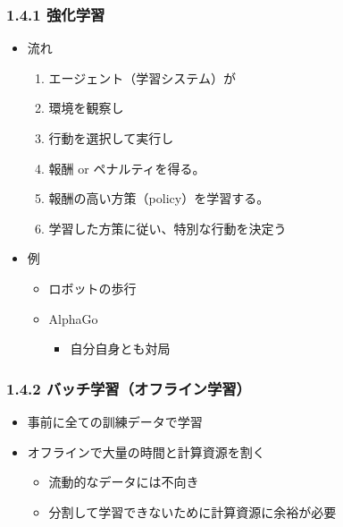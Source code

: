 \documentclass[aspectratio=169, dvipdfmx, 14pt, xcolor={svgnames,dvipsnames}]{beamer}
\def\tightlist{\itemsep1pt\parskip0pt\parsep0pt}
\begin{document}

\begin{frame}
  \frametitle{1.4.1 強化学習}
  \begin{itemize}
    \tightlist
    \item
          流れ

          \begin{enumerate}
            \def\labelenumi{\arabic{enumi}.}
            \tightlist
            \item
                  エージェント（学習システム）が
            \item
                  環境を観察し
            \item
                  行動を選択して実行し
            \item
                  報酬 or ペナルティを得る。
            \item
                  報酬の高い方策（policy）を学習する。
            \item
                  学習した方策に従い、特別な行動を決定う
          \end{enumerate}
    \item
          例

          \begin{itemize}
            \tightlist
            \item
                  ロボットの歩行
            \item
                  AlphaGo

                  \begin{itemize}
                    \tightlist
                    \item
                          自分自身とも対局
                  \end{itemize}
          \end{itemize}
  \end{itemize}
\end{frame}


\begin{frame}
  \frametitle{1.4.2 バッチ学習（オフライン学習）}
  \begin{itemize}
    \tightlist
    \item
          事前に全ての訓練データで学習
    \item
          オフラインで大量の時間と計算資源を割く

          \begin{itemize}
            \tightlist
            \item
                  流動的なデータには不向き
            \item
                  分割して学習できないために計算資源に余裕が必要
          \end{itemize}
  \end{itemize}
\end{frame}
\end{document}
